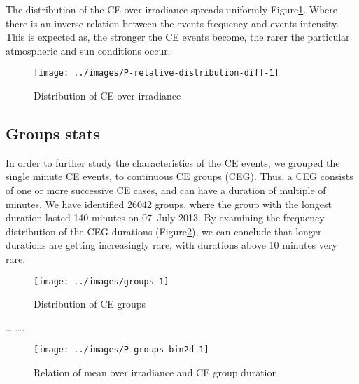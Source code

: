 \documentclass[preprint, 3p,
authoryear]{elsarticle} %
\begin{document}
The distribution of the CE over irradiance spreads uniformly
Figure\nobreakspace{}\ref{fig:ovir-distribution}. Where there is an
inverse relation between the events frequency and events intensity. This
is expected as, the stronger the CE events become, the rarer the
particular atmospheric and sun conditions occur.

\begin{figure}

{\centering \texttt{[image: ../images/P-relative-distribution-diff-1]} 

}

\caption{Distribution of CE over irradiance}\label{fig:ovir-distribution}
\end{figure}

\hypertarget{groups-stats}{%
\subsection{Groups stats}\label{groups-stats}}

In order to further study the characteristics of the CE events, we
grouped the single minute CE events, to continuous CE groups (CEG).
Thus, a CEG consists of one or more successive CE cases, and can have a
duration of multiple of minutes. We have identified 26042 groups, where
the group with the longest duration lasted 140 minutes on 07~July 2013.
By examining the frequency distribution of the CEG durations
(Figure\nobreakspace{}\ref{fig:ceg-duration-distribution}), we can
conclude that longer durations are getting increasingly rare, with
durations above 10 minutes very rare.

\begin{figure}

{\centering \texttt{[image: ../images/groups-1]} 

}

\caption{Distribution of CE groups}\label{fig:ceg-duration-distribution}
\end{figure}

\ldots{} \citet{Zhang2018} \ldots.

\begin{figure}

{\centering \texttt{[image: ../images/P-groups-bin2d-1]} 

}

\caption{Relation of mean over irradiance and CE group duration}\label{fig:unnamed-chunk-3}
\end{figure}
\end{document}
